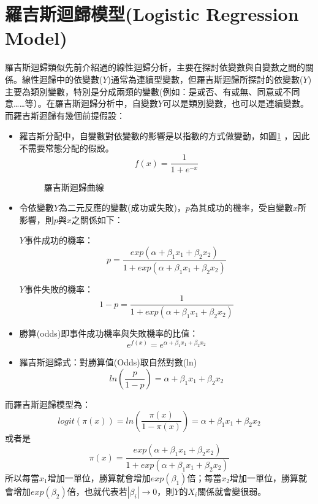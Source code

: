 \section{羅吉斯迴歸模型(Logistic Regression Model)}
羅吉斯迴歸類似先前介紹過的線性迴歸分析，主要在探討依變數與自變數之間的關係。線性迴歸中的依變數($Y$)通常為連續型變數，但羅吉斯迴歸所探討的依變數($Y$)主要為類別變數，特別是分成兩類的變數(例如：是或否、有或無、同意或不同意……等）。在羅吉斯迴歸分析中，自變數$Y$可以是類別變數，也可以是連續變數。而羅吉斯迴歸有幾個前提假設：
\begin{itemize}
\item 羅吉斯分配中，自變數對依變數的影響是以指數的方式做變動，如圖\ref{fig:logistic_curve} ，因此不需要常態分配的假設。
$$f(x)=\frac{1}{1+e^{-x}}$$
\begin{figure}[h]
    \caption{羅吉斯迴歸曲線}
    \label{fig:logistic_curve}
\end{figure}
\item 令依變數$Y$為二元反應的變數(成功或失敗)，$p$為其成功的機率，受自變數$x$所影響，則$p$與$x$之關係如下：

$Y$事件成功的機率：$$p=\frac{exp(\alpha+\beta_1x_1+\beta_2x_2)}{1+exp(\alpha+\beta_1x_1+\beta_2x_2)}$$

$Y$事件失敗的機率：$$1-p=\frac{1}{1+exp(\alpha+\beta_1x_1+\beta_2x_2)}$$

\item 勝算(odds)即事件成功機率與失敗機率的比值：
$$e^{f(x)}=e^{\alpha+\beta_1x_1+\beta_2x_2}$$

\item 羅吉斯迴歸式：對勝算值(Odds)取自然對數(ln)
$$ln\left(\frac{p}{1-p}\right)=\alpha+\beta_1x_1+\beta_2x_2$$
\end{itemize}
而羅吉斯迴歸模型為：
$$logit(\pi(x))=ln\left(\frac{\pi(x)}{1-\pi(x)}\right)=\alpha+\beta_1x_1+\beta_2x_2$$
或者是
$$\pi(x)=\frac{exp(\alpha+\beta_1x_1+\beta_2x_2)}{1+exp(\alpha+\beta_1x_1+\beta_2x_2)}$$
所以每當$x_1$增加一單位，勝算就會增加$exp(\beta_1)$倍；每當$x_2$增加一單位，勝算就會增加$exp(\beta_2)$倍，也就代表若$\left|\beta_i\right|\rightarrow0$，則$Y$的$X_i$關係就會變很弱。



